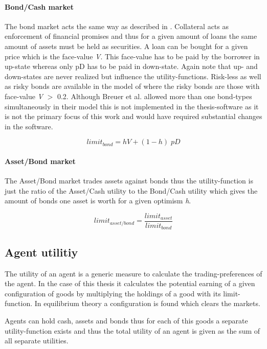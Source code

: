 \documentclass[../Bachelorarbeit.tex]{subfiles}
\begin{document}
\paragraph{Bond/Cash market}
The bond market acts the same way as described in \cite{Geanakoplos2009}. Collateral acts as enforcement of financial promises and thus for a given amount of loans the same amount of assets must be held as securities. A loan can be bought for a given price which is the face-value \textit{V}. This face-value has to be paid by the borrower in up-state whereas only pD has to be paid in down-state. Again note that up- and down-states are never realized but influence the utility-functions.
\medskip
Risk-less as well as risky bonds are available in the model of \cite{Breuer2015} where the risky bonds are those with face-value \textit{V} $>$ 0.2. Although Breuer et al. allowed more than one bond-types simultaneously in their model this is not implemented in the thesis-software as it is not the primary focus of this work and would have required substantial changes in the software.

\begin{equation}
limit_{bond} = h V + ( 1 - h ) \; pD
\end{equation}

\paragraph{Asset/Bond market}
The Asset/Bond market trades assets against bonds thus the utility-function is just the ratio of the Asset/Cash utility to the Bond/Cash utility which gives the amount of bonds one asset is worth for a given optimism \textit{h}.

\begin{equation}
limit_{asset/bond} = \frac{limit_{asset}}{limit_{bond}}
\end{equation}

\subsection{Agent utilitiy}
The utility of an agent is a generic measure to calculate the trading-preferences of the agent. In the case of this thesis it calculates the potential earning of a given configuration of goods by multiplying the holdings of a good with its limit-function. In equilibrium theory a configuration is found which clears the markets.

\medskip

Agents can hold cash, assets and bonds thus for each of this goods a separate utility-function exists and thus the total utility of an agent is given as the sum of all separate utilities.
\end{document}
